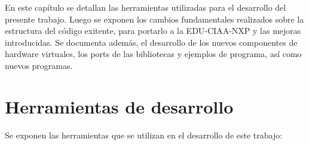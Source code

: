 
En este capítulo se detallan las herramientas utilizadas para el desarrollo del presente trabajo. Luego se exponen los cambios fundamentales realizados sobre la estructura del código exitente, para portarlo a la EDU-CIAA-NXP y las mejoras introducidas. Se documenta además, el desarrollo de los nuevos componentes de hardware virtuales, los ports de las bibliotecas y ejemplos de programa, así como nuevos programas.

\section{Herramientas de desarrollo}
\label{sec:Herramientas de trabajo}

Se exponen las herramientas que se utilizan en el desarrollo de este trabajo:

